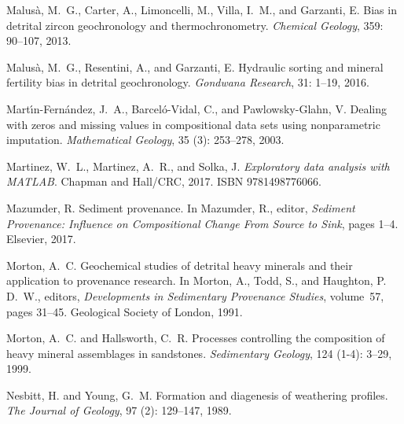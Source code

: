 \documentclass[11pt]{article}
\begin{document}
\begin{thebibliography}{68}
Malus{\`a}, M.~G., Carter, A., Limoncelli, M., Villa, I.~M., and Garzanti, E.
\newblock Bias in detrital zircon geochronology and thermochronometry.
\newblock \emph{Chemical Geology}, 359: 90--107, 2013.

Malus{\`a}, M.~G., Resentini, A., and Garzanti, E.
\newblock Hydraulic sorting and mineral fertility bias in detrital
  geochronology.
\newblock \emph{Gondwana Research}, 31: 1--19, 2016.

Mart{\'\i}n-Fern{\'a}ndez, J.~A., Barcel{\'o}-Vidal, C., and Pawlowsky-Glahn,
  V.
\newblock Dealing with zeros and missing values in compositional data sets
  using nonparametric imputation.
\newblock \emph{Mathematical Geology}, 35 (3): 253--278,
  2003.

Martinez, W.~L., Martinez, A.~R., and Solka, J.
\newblock \emph{{Exploratory data analysis with MATLAB}}.
\newblock Chapman and Hall/CRC, 2017.
\newblock ISBN 9781498776066.

Mazumder, R.
\newblock Sediment provenance.
\newblock In Mazumder, R., editor, \emph{Sediment Provenance: Influence on
  Compositional Change From Source to Sink}, pages 1--4. Elsevier, 2017.

Morton, A.~C.
\newblock Geochemical studies of detrital heavy minerals and their application
  to provenance research.
\newblock In Morton, A., Todd, S., and Haughton, P. D.~W., editors,
  \emph{{Developments in Sedimentary Provenance Studies}}, volume~57, pages
  31--45. Geological Society of London, 1991.

Morton, A.~C. and Hallsworth, C.~R.
\newblock Processes controlling the composition of heavy mineral assemblages in
  sandstones.
\newblock \emph{Sedimentary Geology}, 124 (1-4): 3--29, 1999.

Nesbitt, H. and Young, G.~M.
\newblock Formation and diagenesis of weathering profiles.
\newblock \emph{The Journal of Geology}, 97 (2): 129--147,
  1989.


\end{thebibliography}
\end{document}
